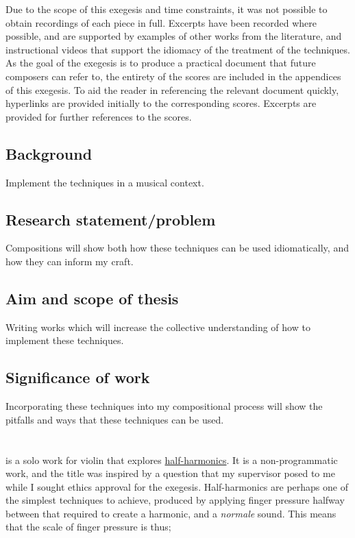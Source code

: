 Due to the scope of this exegesis and time constraints, it was not possible to obtain recordings of each piece in full.
Excerpts have been recorded where possible, and are supported by examples of other works from the literature, and instructional videos that support the idiomacy of the treatment of the techniques.
As the goal of the exegesis is to produce a practical document that future composers can refer to, the entirety of the scores are included in the appendices of this exegesis.
To aid the reader in referencing the relevant document quickly, hyperlinks are provided initially to the corresponding scores. 
Excerpts are provided for further references to the scores.


\subsection{Background}
Implement the techniques in a musical context.
\subsection{Research statement/problem}
Compositions will show both how these techniques can be used idiomatically, and how they can inform my craft.
\subsection{Aim and scope of thesis}
Writing works which will increase the collective understanding of how to implement these techniques.
\subsection{Significance of work}
Incorporating these techniques into my compositional process will show the pitfalls and ways that these techniques can be used.

\section{\violinPiece} \label{sec:violinPiece}
\hyperref[violinPiece]{\violinPiece} is a solo work for violin that explores \hyperref[sec:halfHarmonicsDiscussion]{half-harmonics}.
It is a non-programmatic work, and the title was inspired by a question that my supervisor posed to me while I sought ethics approval for the exegesis.
Half-harmonics are perhaps one of the simplest techniques to achieve, produced by applying finger pressure halfway between that required to create a harmonic, and a \emph{normale} sound.
This means that the scale of finger pressure is thus;

